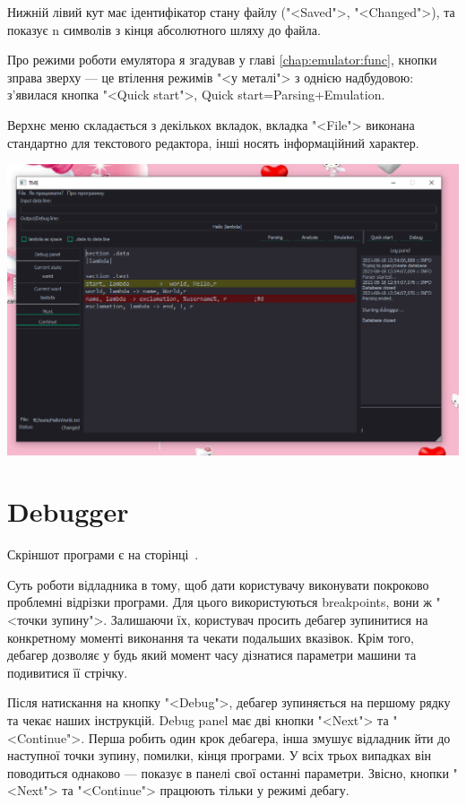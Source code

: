 \documentclass[oneside,final,14pt]{extreport}
\newenvironment{changemargin}[2]{%
\begin{list}{}{%
\setlength{\topsep}{0pt}%
\setlength{\leftmargin}{#1}%
\setlength{\rightmargin}{#2}%
\setlength{\listparindent}{\parindent}%
\setlength{\itemindent}{\parindent}%
\setlength{\parsep}{\parskip}%
}%
\item[]}{\end{list}}
\begin{document}
Нижній лівий кут має ідентифікатор стану файлу ("<Saved">, "<Changed">), та показує n символів з кінця абсолютного шляху до файла.

Про режими роботи емулятора я згадував у главі
\ref{chap:emulator:func}, кнопки зправа зверху --- це втілення режимів "<у металі"> з однією надбудовою: з'явилася кнопка "<Quick start">, Quick start=Parsing+Emulation.

Верхнє меню складається з декількох вкладок, вкладка "<File"> виконана стандартно для текстового редактора, інші носять інформаційний характер.

\begin{changemargin}{-10,3cm}{1,1cm}
\begin{landscape}
\includegraphics[scale=0.94]{1}
\label{screenshot}
\end{landscape}
\end{changemargin}

\newpage
\section{Debugger}
Скріншот програми є на сторінці \,\pageref{screenshot}.
\medskip

Суть роботи відладника в тому, щоб дати користувачу виконувати покроково проблемні відрізки програми. Для цього використуються breakpoints, вони ж "<точки зупину">. Залишаючи їх, користувач просить дебагер зупинитися на конкретному моменті виконання та чекати подальших вказівок. Крім того, дебагер дозволяє у будь який момент часу дізнатися параметри машини та подивитися її стрічку.

Після натискання на кнопку "<Debug">, дебагер зупиняється на першому рядку та чекає наших інструкцій. Debug panel має дві кнопки "<Next"> та "<Continue">. Перша робить один крок дебагера, інша змушує відладник йти до наступної точки зупину, помилки, кінця програми. У всіх трьох випадках він поводиться однаково --- показує в панелі свої останні параметри.
Звісно, кнопки "<Next"> та "<Continue"> працюють тільки у режимі дебагу.
\end{document}
